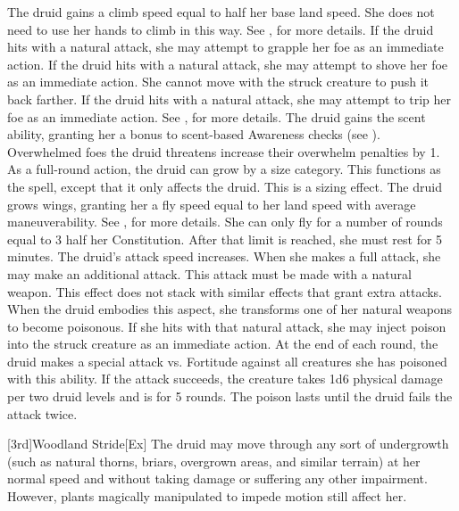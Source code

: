 The druid gains a climb speed equal to half her base land speed.
She does not need to use her hands to climb in this way.
See , for more details.
If the druid hits with a natural attack, she may attempt to grapple her foe as an immediate action.
If the druid hits with a natural attack, she may attempt to shove her foe as an immediate action.
She cannot move with the struck creature to push it back farther.
If the druid hits with a natural attack, she may attempt to trip her foe as an immediate action.
See , for more details.
The druid gains the scent ability, granting her a  bonus to scent-based Awareness checks (see ).
Overwhelmed foes the druid threatens increase their overwhelm penalties by 1.
As a full-round action, the druid can grow by a size category.
This functions as the  spell, except that it only affects the druid.
This is a sizing effect.
The druid grows wings, granting her a fly speed equal to her land speed with average maneuverability.
See , for more details.
She can only fly for a number of rounds equal to 3 \add half her Constitution.
After that limit is reached, she must rest for 5 minutes.
The druid's attack speed increases.
When she makes a full attack, she may make an additional attack.
This attack must be made with a natural weapon.
This effect does not stack with similar effects that grant extra attacks.
When the druid embodies this aspect, she transforms one of her natural weapons to become poisonous.
If she hits with that natural attack, she may inject poison into the struck creature as an immediate action.
At the end of each round, the druid makes a special attack vs. Fortitude against all creatures she has poisoned with this ability.
If the attack succeeds, the creature takes 1d6 physical damage per two druid levels and is \sickened for 5 rounds.
The poison lasts until the druid fails the attack twice.

[3rd]{Woodland Stride}[Ex]
The druid may move through any sort of undergrowth (such as natural thorns, briars, overgrown areas, and similar terrain) at her normal speed and without taking damage or suffering any other impairment.
However, plants magically manipulated to impede motion still affect her.

